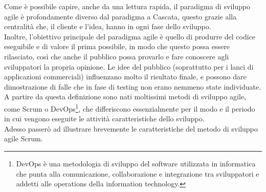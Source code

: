 Come è possibile capire, anche da una lettura rapida, il paradigma di sviluppo agile è profondamente diverso dal paradigma a Cascata, questo grazie alla centralità che, il cliente e l'idea, hanno in ogni fase dello sviluppo.
\\
Inoltre, l'obiettivo principale del paradigma agile è quello di produrre del codice eseguibile e di valore il prima possibile, in modo che questo possa essere rilasciato, così che anche il pubblico possa provarlo e fare conoscere agli sviluppatori la propria opinione. Le idee del pubblico (soprattutto per i lanci di applicazioni commerciali) influenzano molto il risultato finale, e possono dare dimostrazione di falle che in fase di testing non erano nemmeno state individuate.
\\
A partire da questa definizione sono nati moltissimi metodi di sviluppo agile, come Scrum o 
DevOps\footnote{DevOps è una metodologia di sviluppo del software utilizzata in informatica che punta alla comunicazione, collaborazione e integrazione tra sviluppatori e addetti alle operations della information technology.\cite{DevOpsWiki}},
che differiscono essenzialmente per il modo e il periodo in cui vengono eseguite le attività caratteristiche dello sviluppo.
\\
Adesso passerò ad illustrare brevemente le caratteristiche del metodo di sviluppo agile Scrum.


